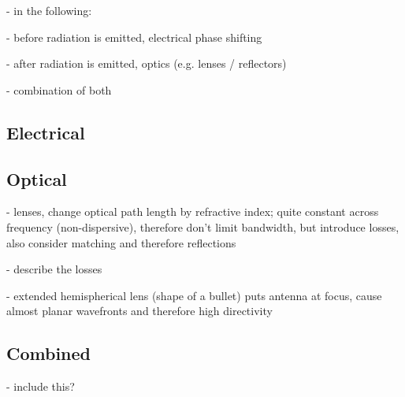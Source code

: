 \documentclass[]{report}
\begin{document}
- in the following:

- before radiation is emitted, electrical phase shifting

- after radiation is emitted, optics (e.g. lenses / reflectors)

- combination of both

\subsection{Electrical}

\subsection{Optical}

- lenses, change optical path length by refractive index; quite constant across frequency (non-dispersive), therefore don't limit bandwidth, but introduce losses, also consider matching and therefore reflections

- describe the losses

- extended hemispherical lens (shape of a bullet) puts antenna at focus, cause almost planar wavefronts and therefore high directivity

\subsection{Combined}

- include this?
\end{document}
